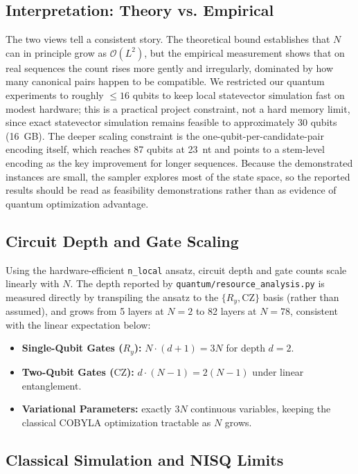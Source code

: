 \documentclass[11pt,a4paper]{article}
\begin{document}
	\subsection{Interpretation: Theory vs. Empirical}
	
	The two views tell a consistent story. The theoretical bound establishes that $N$ can in principle grow as $\mathcal{O}(L^2)$, but the empirical measurement shows that on real sequences the count rises more gently and irregularly, dominated by how many canonical pairs happen to be compatible. We restricted our quantum experiments to roughly $\le 16$ qubits to keep local statevector simulation fast on modest hardware; this is a practical project constraint, not a hard memory limit, since exact statevector simulation remains feasible to approximately 30 qubits (16~GB). The deeper scaling constraint is the one-qubit-per-candidate-pair encoding itself, which reaches 87 qubits at 23~nt and points to a stem-level encoding as the key improvement for longer sequences. Because the demonstrated instances are small, the sampler explores most of the state space, so the reported results should be read as feasibility demonstrations rather than as evidence of quantum optimization advantage.
	
	\subsection{Circuit Depth and Gate Scaling}
	
	Using the hardware-efficient \texttt{n\_local} ansatz, circuit depth and gate counts scale linearly with $N$. The depth reported by \texttt{quantum/resource\_analysis.py} is measured directly by transpiling the ansatz to the $\{R_y, \text{CZ}\}$ basis (rather than assumed), and grows from 5 layers at $N=2$ to 82 layers at $N=78$, consistent with the linear expectation below:
	\begin{itemize}[leftmargin=1.2cm]
		\item \textbf{Single-Qubit Gates ($R_y$):} $N \cdot (d+1) = 3N$ for depth $d = 2$.
		\item \textbf{Two-Qubit Gates ($\text{CZ}$):} $d \cdot (N-1) = 2(N-1)$ under linear entanglement.
		\item \textbf{Variational Parameters:} exactly $3N$ continuous variables, keeping the classical COBYLA optimization tractable as $N$ grows.
	\end{itemize}
	
	\subsection{Classical Simulation and NISQ Limits}
	
\end{document}
